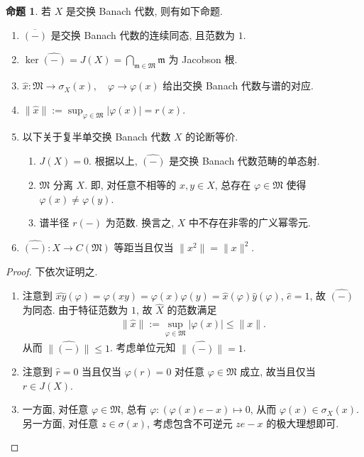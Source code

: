 \documentclass{MainStyle}
\theoremstyle{definition}
\theoremstyle{definition}
\theoremstyle{definition}
\theoremstyle{definition}
\newtheorem{proposition}{命题}
\theoremstyle{definition}
\theoremstyle{definition}
\theoremstyle{definition}
\theoremstyle{remark}
\theoremstyle{remark}
\begin{document}
\begin{proposition}
    若 $X$ 是交换 Banach 代数, 则有如下命题.
    \begin{enumerate}
        \item $\overline{(-)}$ 是交换 Banach 代数的连续同态, 且范数为 $1$.
        \item $\ker \widehat{(-)}=J(X)=\bigcap _{\mathfrak m\in \mathfrak M}\mathfrak m$ 为 Jacobson 根.
        \item $\widehat x:\mathfrak M\to \sigma_X(x),\quad \varphi\to \varphi (x)$ 给出交换 Banach 代数与谱的对应.
        \item $\|\widehat x\|:=\sup_{\varphi \in \mathfrak M}|\varphi (x)|=r(x)$.
        \item 以下关于复半单交换 Banach 代数 $X$ 的论断等价.
              \begin{enumerate}
                  \item $J(X)=0$. 根据以上, $\widehat{(-)}$ 是交换 Banach 代数范畴的单态射.
                  \item $\mathfrak M$ 分离 $X$. 即, 对任意不相等的 $x,y\in X$, 总存在 $\varphi \in \mathfrak M$ 使得 $\varphi(x)\neq \varphi(y)$.
                  \item 谱半径 $r(-)$ 为范数. 换言之, $X$ 中不存在非零的广义幂零元.
              \end{enumerate}
        \item $\widehat{(-)}:X\to C(\mathfrak M)$ 等距当且仅当 $\|x^2\|=\|x\|^2$.
    \end{enumerate}
    \begin{proof}
        下依次证明之.
        \begin{enumerate}
            \item 注意到 $\widehat{xy}(\varphi)=\varphi (xy)=\varphi(x)\varphi(y)=\widehat{x}(\varphi)\widehat{y}(\varphi)$, $\widehat{e}=1$, 故 $\widehat{(-)}$ 为同态. 由于特征范数为 $1$, 故 $\widehat X$ 的范数满足
                  \begin{align*}
                      \|\widehat{x}\|:=\sup_{\varphi\in \mathfrak M}|\varphi(x)|\leq \|x\|.
                  \end{align*}
                  从而 $\|\widehat{(-)}\|\leq 1$. 考虑单位元知 $\|\widehat{(-)}\|=1$.
            \item 注意到 $\widehat r=0$ 当且仅当 $\varphi (r)=0$ 对任意 $\varphi\in \mathfrak M$ 成立, 故当且仅当 $r\in J(X)$.
            \item 一方面, 对任意 $\varphi\in \mathfrak M$, 总有 $\varphi:(\varphi (x)e-x)\mapsto 0$, 从而 $\varphi(x)\in \sigma_X(x)$. 另一方面, 对任意 $z\in \sigma(x)$, 考虑包含不可逆元 $ze-x$ 的极大理想即可.

\end{enumerate}
\end{proof}
\end{proposition}
\end{document}
